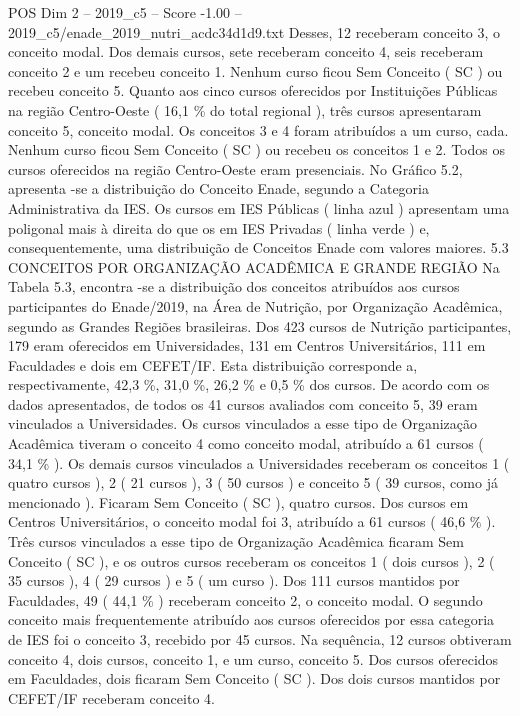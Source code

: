\begin{textsample}{POS Dim 2 – 2019\_c5 – Score -1.00 – 2019\_c5/enade\_2019\_nutri\_acdc34d1d9.txt}
Desses, 12 receberam conceito 3, o conceito modal.
Dos demais cursos, sete receberam conceito 4, seis receberam conceito 2 e um recebeu conceito 1.
Nenhum curso ficou Sem Conceito ( SC ) ou recebeu conceito 5.
Quanto aos cinco cursos oferecidos por Instituições Públicas na região Centro-Oeste ( 16,1 \% do total regional ), três cursos apresentaram conceito 5, conceito modal.
Os conceitos 3 e 4 foram atribuídos a um curso, cada.
Nenhum curso ficou Sem Conceito ( SC ) ou recebeu os conceitos 1 e 2.
Todos os cursos oferecidos na região Centro-Oeste eram presenciais.
No Gráfico 5.2, apresenta -se a distribuição do Conceito Enade, segundo a Categoria Administrativa da IES.
Os cursos em IES Públicas ( linha azul ) apresentam uma poligonal mais à direita do que os em IES Privadas ( linha verde ) e, consequentemente, uma distribuição de Conceitos Enade com valores maiores. 5.3 CONCEITOS POR ORGANIZAÇÃO ACADÊMICA E GRANDE REGIÃO Na Tabela 5.3, encontra -se a distribuição dos conceitos atribuídos aos cursos participantes do Enade/2019, na Área de Nutrição, por Organização Acadêmica, segundo as Grandes Regiões brasileiras.
Dos 423 cursos de Nutrição participantes, 179 eram oferecidos em Universidades, 131 em Centros Universitários, 111 em Faculdades e dois em CEFET/IF.
Esta distribuição corresponde a, respectivamente, 42,3 \%, 31,0 \%, 26,2 \% e 0,5 \% dos cursos.
De acordo com os dados apresentados, de todos os 41 cursos avaliados com conceito 5, 39 eram vinculados a Universidades.
Os cursos vinculados a esse tipo de Organização Acadêmica tiveram o conceito 4 como conceito modal, atribuído a 61 cursos ( 34,1 \% ).
Os demais cursos vinculados a Universidades receberam os conceitos 1 ( quatro cursos ), 2 ( 21 cursos ), 3 ( 50 cursos ) e conceito 5 ( 39 cursos, como já mencionado ).
Ficaram Sem Conceito ( SC ), quatro cursos.
Dos cursos em Centros Universitários, o conceito modal foi 3, atribuído a 61 cursos ( 46,6 \% ).
Três cursos vinculados a esse tipo de Organização Acadêmica ficaram Sem Conceito ( SC ), e os outros cursos receberam os conceitos 1 ( dois cursos ), 2 ( 35 cursos ), 4 ( 29 cursos ) e 5 ( um curso ).
Dos 111 cursos mantidos por Faculdades, 49 ( 44,1 \% ) receberam conceito 2, o conceito modal.
O segundo conceito mais frequentemente atribuído aos cursos oferecidos por essa categoria de IES foi o conceito 3, recebido por 45 cursos.
Na sequência, 12 cursos obtiveram conceito 4, dois cursos, conceito 1, e um curso, conceito 5.
Dos cursos oferecidos em Faculdades, dois ficaram Sem Conceito ( SC ).
Dos dois cursos mantidos por CEFET/IF receberam conceito 4.

\end{textsample}
